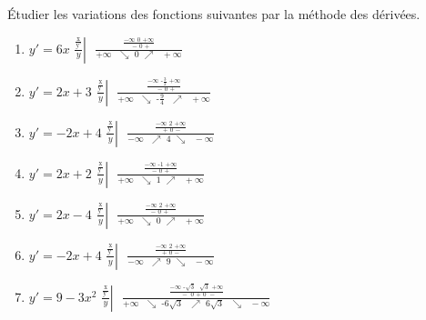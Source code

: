 \begin{solution}
Étudier les variations des fonctions suivantes par la méthode des dérivées.
\begin{enumerate}
\item ${y}'=6x$
$\left. \frac{\frac{\text{x}}{{\text{{y}'}}}}{y} \right|\text{ }\frac{\frac{-\infty \text{                    0                   +}\infty }{\text{ }-\text{        0         +}}}{+\infty \text{  }\searrow \text{          0      }\nearrow \text{   }+\infty }$

\item ${y}'=2x+3$
$\left. \frac{\frac{\text{x}}{{\text{{y}'}}}}{y} \right|\text{ }\frac{\frac{-\infty \text{                 -}\frac{\text{3}}{\text{2}}\text{                   +}\infty }{\text{ }-\text{     0        +}}}{+\infty \text{  }\searrow \text{      -}\frac{\text{9}}{\text{4}}\text{      }\nearrow \text{  }+\infty }$

\item ${y}'=-2x+4$
$\left. \frac{\frac{\text{x}}{{\text{{y}'}}}}{y} \right|\text{ }\frac{\frac{-\infty \text{              2                   +}\infty }{\text{ +     0         }-}}{-\infty \text{  }\nearrow \text{      4      }\searrow \text{     }-\infty }$

\item ${y}'=2x+2$
$\left. \frac{\frac{\text{x}}{{\text{{y}'}}}}{y} \right|\text{ }\frac{\frac{-\infty \text{              -1                   +}\infty }{-\text{     0         +}}}{+\infty \text{   }\searrow \text{        1      }\nearrow \text{       }+\infty }$

\item ${y}'=2x-4$
$\left. \frac{\frac{\text{x}}{{\text{{y}'}}}}{y} \right|\text{ }\frac{\frac{-\infty \text{                 2                     +}\infty }{-\text{          0           +   }}}{+\infty \text{   }\searrow \text{        0        }\nearrow \text{     }+\infty }$

\item ${y}'=-2x+4$
$\left. \frac{\frac{\text{x}}{{\text{{y}'}}}}{y} \right|\text{ }\frac{\frac{-\infty \text{                2                   +}\infty }{\text{+        0         }-}}{-\infty \text{      }\nearrow \text{      9      }\searrow \text{       }-\infty }$

\item ${y}'=9-3{{x}^{2}}$ 
$\left. \frac{\frac{\text{x}}{{\text{{y}'}}}}{y} \right|\text{ }\frac{\frac{-\infty \text{                   -}\sqrt{\text{3}}\text{                  }\sqrt{\text{3}}\text{               +}\infty }{\text{   }-\text{         0        +          0        }-}}{+\infty \text{      }\searrow \text{    -6}\sqrt{\text{3}}\text{   }\nearrow \text{       6}\sqrt{\text{3}}\text{    }\searrow \text{   }-\infty }$


\end{enumerate}
\end{solution}
